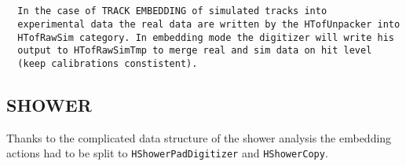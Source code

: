 \begin{lstlisting}
                                                                        
                                                                        
  In the case of TRACK EMBEDDING of simulated tracks into
  experimental data the real data are written by the HTofUnpacker into
  HTofRawSim category. In embedding mode the digitizer will write his
  output to HTofRawSimTmp to merge real and sim data on hit level
  (keep calibrations constistent).
\end{lstlisting}

\subsection{SHOWER}

Thanks to the complicated data structure of the shower analysis the embedding 
actions had to be split to \verb+HShowerPadDigitizer+ and \verb+HShowerCopy+.

